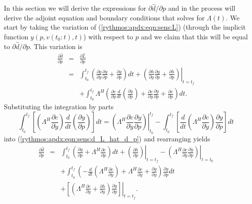 \documentclass[pdf,ps2pdf,11pt]{SANDreport}
\begin{document}
In this section we will derive the expressions for $\partial {}\hat{d}
/ {}\partial p$ and in the process will derive the adjoint equation
and boundary conditions that solves for $\Lambda(t)$.  We start by
taking the variation of (\ref{rythmos:apdx:eqn:sens:L}) (through the
implicit function $y(p,v(t_0:t),t)$) with respect to $p$ and we claim
that this will be equal to $\partial {}\hat{d} / {}\partial p$.  This
variation is
%
\begin{eqnarray}
\frac{\partial \hat{d}}{\partial p}
& = & \frac{\partial \hat{L}}{\partial p}
\nonumber \\
& = & \int_{t_0}^{t_f} \left( \frac{\partial g}{\partial y} \frac{\partial y}{\partial p} +  \frac{\partial g}{\partial p} \right) dt
+ \left. \left(  \frac{\partial h}{\partial y} \frac{\partial y}{\partial p} + \frac{\partial h}{\partial p} \right) \right|_{t=t_f}
\nonumber \\
& & + \int_{t_0}^{t_f} \Lambda^H \left( \frac{\partial c}{\partial \dot{y}} \frac{d}{dt}\left( \frac{\partial y}{\partial p} \right)
   + \frac{\partial c}{\partial y} \frac{\partial y}{\partial p} +  \frac{\partial c}{\partial p} \right) dt.
\label{rythmos:apdx:eqn:sens:d_L_hat_d_p}
\end{eqnarray}
%
Substituting the integration by parts
%
\begin{equation}
\int_{t_0}^{t_f} \left[ \left( \Lambda^H \frac{\partial c}{\partial \dot{y}} \right) \frac{d}{dt}\left( \frac{\partial y}{\partial p} \right) \right] dt
= \left. \left( \Lambda^H \frac{\partial c}{\partial \dot{y}} \frac{\partial y}{\partial p} \right) \right|_{t_0}^{t_f}
- \int_{t_0}^{t_f} \left[ \frac{d}{dt}\left( \Lambda^H \frac{\partial c}{\partial \dot{y}} \right) \frac{\partial y}{\partial p} \right] dt
\end{equation}
%
into (\ref{rythmos:apdx:eqn:sens:d_L_hat_d_p}) and rearranging yields
%
\begin{eqnarray}
\frac{\partial \hat{d}}{\partial p}
& = & \int_{t_0}^{t_f} \left(
    \frac{\partial g}{\partial p}
    + \Lambda^H \frac{\partial c}{\partial p}
  \right) dt
  + \left. \left( \frac{\partial h}{\partial p} \right) \right|_{t=t_f}
  - \left. \left( \Lambda^H \frac{\partial c}{\partial \dot{y}} \frac{\partial y}{\partial p} \right) \right|_{t=t_0}
\nonumber \\
& & + \int_{t_0}^{t_f} \left(
    - \frac{d}{dt}\left( \Lambda^H \frac{\partial c}{\partial \dot{y}} \right)
    +  \Lambda^H \frac{\partial c}{\partial y} +  \frac{\partial g}{\partial y}
  \right) \frac{\partial y}{\partial p} dt
\nonumber \\
& & + \left. \left[ \left(
    \Lambda^H \frac{\partial c}{\partial \dot{y}}
    +  \frac{\partial h}{\partial y}
  \right)  \frac{\partial y}{\partial p} \right] \right|_{t=t_f}
\label{rythmos:apdx:eqn:sens:d_L_hat_d_p_2}.
\end{eqnarray}
\end{document}
